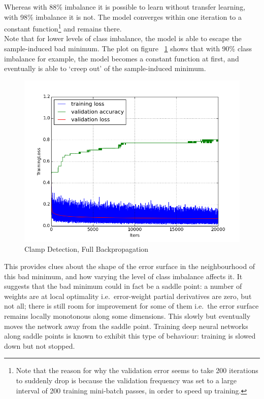 \documentclass[a4paper,11pt]{article}
\begin{document}
Whereas with 88\% imbalance it is possible to learn without transfer learning, with 98\% imbalance it is not. The model converges within one iteration to a constant function\footnote{Note that the reason for why the validation error seems to take 200 iterations to suddenly drop is because the validation frequency was set to a large interval of 200 training mini-batch passes, in order to speed up training.} and remains there. \\

Note that for lower levels of class imbalance, the model is able to escape the sample-induced bad minimum. The plot on figure ~\ref{f44} shows that with 90\% class imbalance for example, the model becomes a constant function at first, and eventually is able to `creep out' of the sample-induced minimum. \\

\begin{figure}[h!]
	\centering
	\includegraphics[scale=0.5]{images/plot_clampdetCI_none.png}
	\caption{Clamp Detection, Full Backpropagation}
    \label{f44}
\end{figure}

This provides clues about the shape of the error surface in the neighbourhood of this bad minimum, and how varying the level of class imbalance affects it. It suggests that the bad minimum could in fact be a saddle point: a number of weights are at local optimality i.e.\ error-weight partial derivatives are zero, but not all; there is still room for improvement for some of them i.e.\ the error surface remains locally monotonous along some dimensions. This slowly but eventually moves the network away from the saddle point. Training deep neural networks along saddle points is known to exhibit this type of behaviour: training is slowed down but not stopped\cite{DL-book}.
\end{document}

